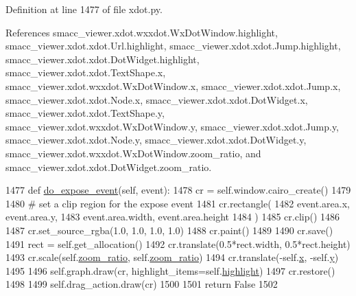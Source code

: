 Definition at line 1477 of file xdot.\+py.



References smacc\+\_\+viewer.\+xdot.\+wxxdot.\+Wx\+Dot\+Window.\+highlight, smacc\+\_\+viewer.\+xdot.\+xdot.\+Url.\+highlight, smacc\+\_\+viewer.\+xdot.\+xdot.\+Jump.\+highlight, smacc\+\_\+viewer.\+xdot.\+xdot.\+Dot\+Widget.\+highlight, smacc\+\_\+viewer.\+xdot.\+xdot.\+Text\+Shape.\+x, smacc\+\_\+viewer.\+xdot.\+wxxdot.\+Wx\+Dot\+Window.\+x, smacc\+\_\+viewer.\+xdot.\+xdot.\+Jump.\+x, smacc\+\_\+viewer.\+xdot.\+xdot.\+Node.\+x, smacc\+\_\+viewer.\+xdot.\+xdot.\+Dot\+Widget.\+x, smacc\+\_\+viewer.\+xdot.\+xdot.\+Text\+Shape.\+y, smacc\+\_\+viewer.\+xdot.\+wxxdot.\+Wx\+Dot\+Window.\+y, smacc\+\_\+viewer.\+xdot.\+xdot.\+Jump.\+y, smacc\+\_\+viewer.\+xdot.\+xdot.\+Node.\+y, smacc\+\_\+viewer.\+xdot.\+xdot.\+Dot\+Widget.\+y, smacc\+\_\+viewer.\+xdot.\+wxxdot.\+Wx\+Dot\+Window.\+zoom\+\_\+ratio, and smacc\+\_\+viewer.\+xdot.\+xdot.\+Dot\+Widget.\+zoom\+\_\+ratio.


\begin{DoxyCode}
1477     \textcolor{keyword}{def }\hyperlink{classsmacc__viewer_1_1xdot_1_1xdot_1_1DotWidget_a3690e9f6b0b3f7f99c30b237b38cdde6}{do\_expose\_event}(self, event):
1478         cr = self.window.cairo\_create()
1479 
1480         \textcolor{comment}{# set a clip region for the expose event}
1481         cr.rectangle(
1482             event.area.x, event.area.y,
1483             event.area.width, event.area.height
1484         )
1485         cr.clip()
1486 
1487         cr.set\_source\_rgba(1.0, 1.0, 1.0, 1.0)
1488         cr.paint()
1489 
1490         cr.save()
1491         rect = self.get\_allocation()
1492         cr.translate(0.5*rect.width, 0.5*rect.height)
1493         cr.scale(self.\hyperlink{classsmacc__viewer_1_1xdot_1_1xdot_1_1DotWidget_a61694eba4278e9726bbef68a9ca3f594}{zoom\_ratio}, self.\hyperlink{classsmacc__viewer_1_1xdot_1_1xdot_1_1DotWidget_a61694eba4278e9726bbef68a9ca3f594}{zoom\_ratio})
1494         cr.translate(-self.\hyperlink{classsmacc__viewer_1_1xdot_1_1xdot_1_1DotWidget_a828aac52a08d67c493696b074b6326da}{x}, -self.\hyperlink{classsmacc__viewer_1_1xdot_1_1xdot_1_1DotWidget_a1f5ee9fba6b3fe02772831d9bf6d7481}{y})
1495 
1496         self.graph.draw(cr, highlight\_items=self.\hyperlink{classsmacc__viewer_1_1xdot_1_1xdot_1_1DotWidget_af5a63433d396e1bfa5dc325a79267220}{highlight})
1497         cr.restore()
1498 
1499         self.drag\_action.draw(cr)
1500 
1501         \textcolor{keywordflow}{return} \textcolor{keyword}{False}
1502 
\end{DoxyCode}
